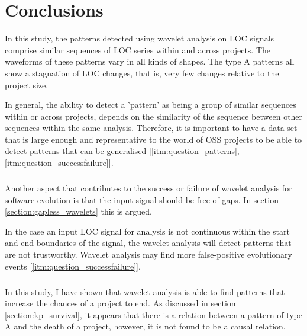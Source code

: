 \chapter{Conclusions}
\label{conclusions}

\begin{comment}
- Patterns AB are false-negatives; the indicate a warning sign in some cases, in
other cases they don't.
- One pattern does not correspond to a specific event. A pattern is the result
of an event and patterns just show similarities. It is not possible to directly
link a pattern to an event. The opposite could be true, but was not studied.

\end{comment}

In this study, the patterns detected using wavelet analysis on LOC signals
comprise similar sequences of LOC series within and across projects. The
waveforms of these patterns vary in all kinds of shapes. The type A patterns
all show a stagnation of LOC changes, that is, very few changes relative to the
project size.

In general, the ability to detect a 'pattern' as being a group of similar
sequences within or across projects, depends on the similarity of the sequence
between other sequences within the same analysis. Therefore, it is important to
have a data set that is large enough and representative to the world of OSS
projects to be able to detect patterns that can be generalised
[\ref{itm:question_patterns}, \ref{itm:question_successfailure}].

\paragraph{}
Another aspect that contributes to the success or failure of wavelet analysis
for software evolution is that the input signal should be free of gaps. In
section \ref{section:gapless_wavelets} this is argued.

In the case an input LOC signal for analysis is not continuous within the start
and end boundaries of the signal, the wavelet analysis will detect patterns
that are not trustworthy. Wavelet analysis may find more false-positive
evolutionary events [\ref{itm:question_successfailure}].

\paragraph{}
In this study, I have shown that wavelet analysis is able to find patterns that
increase the chances of a project to end. As discussed in section
\ref{section:kp_survival}, it appears that there is a relation between a
pattern of type A and the death of a project, however, it is not found to be a
causal relation.

